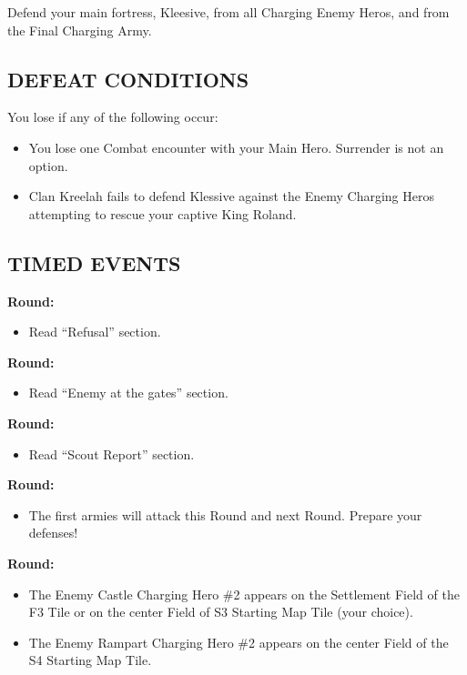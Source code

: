 \begin{multicols}{2}
Defend your main fortress, Kleesive, from all Charging Enemy Heros, and from the Final Charging Army.

\subsection*{\MakeUppercase{Defeat Conditions}}

You lose if any of the following occur:

\begin{itemize}
  \item You lose one Combat encounter with your Main Hero.
    Surrender is not an option.
  \item Clan Kreelah fails to defend Klessive against the Enemy Charging Heros attempting to rescue your captive King Roland.
\end{itemize}

\subsection*{\MakeUppercase{Timed Events}}

\textbf{ Round:}
\begin{itemize}
  \item Read ``Refusal'' section.
\end{itemize}

\textbf{ Round:}
\begin{itemize}
  \item Read ``Enemy at the gates'' section.
\end{itemize}

\textbf{ Round:}
\begin{itemize}
  \item Read ``Scout Report'' section.
\end{itemize}

\textbf{ Round:}
\begin{itemize}
  \item The first armies will attack this Round and next Round. Prepare your defenses!
\end{itemize}

\textbf{ Round:}
\begin{itemize}
  \item The Enemy Castle Charging Hero \#2 appears on the Settlement Field of the F3 Tile or on the center Field of S3 Starting Map Tile (your choice).
  \item The Enemy Rampart Charging Hero \#2 appears on the center Field of the S4 Starting Map Tile.
\end{itemize}


\end{multicols}
